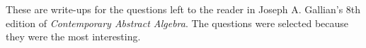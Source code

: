 These are write-ups for the questions left to the reader in Joseph A. Gallian's 8th edition of \textit{Contemporary Abstract Algebra}. The questions were selected because they were the most interesting.